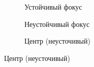\begin{figure}[H]
  \centering

  \begin{subfigure}[b]{0.3\textwidth}
    
    \caption{Устойчивый фокус}

  \end{subfigure}
  \qquad
  \begin{subfigure}[b]{0.3\textwidth}

    
    \caption{Неустойчивый фокус}

  \end{subfigure}
  \qquad
  \begin{subfigure}[b]{0.3\textwidth}

    
    \caption{Центр (неусточивый)}

  \end{subfigure}
\end{figure}
